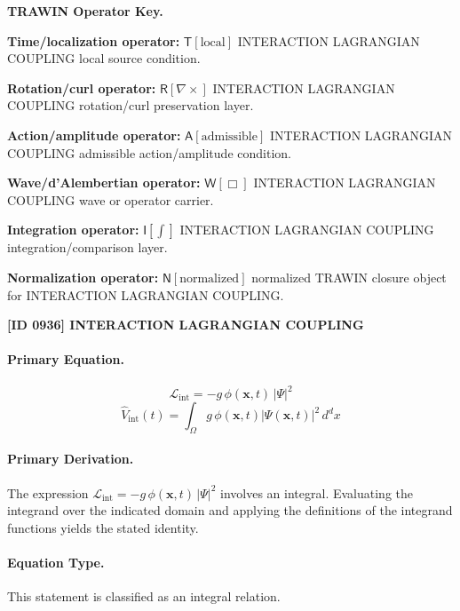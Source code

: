 \par\vspace{0.45\baselineskip}
\noindent\begin{minipage}[t]{\linewidth}
\begingroup
\small
\raggedright
\textbf{TRAWIN Operator Key.}\par
\noindent\textbf{Time/localization operator:} $\mathsf{T}\!\left[\mathrm{local}\right]$ INTERACTION LAGRANGIAN COUPLING local source condition.\par
\noindent\textbf{Rotation/curl operator:} $\mathsf{R}\!\left[\nabla\times\right]$ INTERACTION LAGRANGIAN COUPLING rotation/curl preservation layer.\par
\noindent\textbf{Action/amplitude operator:} $\mathsf{A}\!\left[\mathrm{admissible}\right]$ INTERACTION LAGRANGIAN COUPLING admissible action/amplitude condition.\par
\noindent\textbf{Wave/d'Alembertian operator:} $\mathsf{W}\!\left[\Box\right]$ INTERACTION LAGRANGIAN COUPLING wave or operator carrier.\par
\noindent\textbf{Integration operator:} $\mathsf{I}\!\left[\int\right]$ INTERACTION LAGRANGIAN COUPLING integration/comparison layer.\par
\noindent\textbf{Normalization operator:} $\mathsf{N}\!\left[\mathrm{normalized}\right]$ normalized TRAWIN closure object for INTERACTION LAGRANGIAN COUPLING.\par
\endgroup
\end{minipage}

\clearpage
\noindent\textbf{[ID 0936] INTERACTION LAGRANGIAN COUPLING}\par
\vspace{0.35em}
\paragraph{Primary Equation.}
\[
\mathcal{L}_{\mathrm{int}}=-g\,\phi(\mathbf{x},t)\,|\Psi|^2
\]
\[
\hat{V}_{\mathrm{int}}(t)=\int_{\Omega} g\,\phi(\mathbf{x},t)|\Psi(\mathbf{x},t)|^2\,d^d x
\]

\paragraph{Primary Derivation.}
The expression \( \mathcal{L}_{\mathrm{int}}=-g\,\phi(\mathbf{x},t)\,|\Psi|^2 \) involves an integral. Evaluating the integrand over the indicated domain and applying the definitions of the integrand functions yields the stated identity.
\paragraph{Equation Type.}
This statement is classified as an integral relation.

